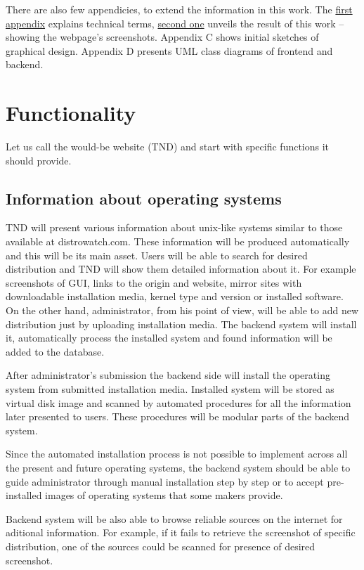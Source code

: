 \documentclass[thesis=B,english]{FITthesis}[2013/04/26]
\begin{document}
There are also few appendicies, to extend the information in this work. The \hyperref[TODO]{first appendix} explains technical terms, \hyperref[TODO]{second one} unveils the result of this work -- showing the webpage's screenshots. Appendix C shows initial sketches of graphical design. Appendix D presents UML class diagrams of frontend and backend.

\section{Functionality}

Let us call the would-be website  (TND) and start with specific functions it should provide.

\subsection{Information about operating systems}

TND will present various information about unix-like systems similar to those available at distrowatch.com. These information will be produced automatically and this will be its main asset. Users will be able to search for desired distribution and TND will show them detailed information about it. For example screenshots of GUI, links to the origin and website, mirror sites with downloadable installation media, kernel type and version or installed software. On the other hand, administrator, from his point of view, will be able to add new distribution just by uploading installation media. The backend system will install it, automatically process the installed system and found information will be added to the database.

After administrator's submission the backend side will install the operating system from submitted installation media. Installed system will be stored as virtual disk image and scanned by automated procedures for all the information later presented to users. These procedures will be modular parts of the backend system.

Since the automated installation process is not possible to implement across all the present and future operating systems, the backend system should be able to guide administrator through manual installation step by step or to accept pre-installed images of operating systems that some makers provide.

Backend system will be also able to browse reliable sources on the internet for aditional information. For example, if it fails to retrieve the screenshot of specific distribution, one of the sources could be scanned for presence of desired screenshot.
\end{document}
